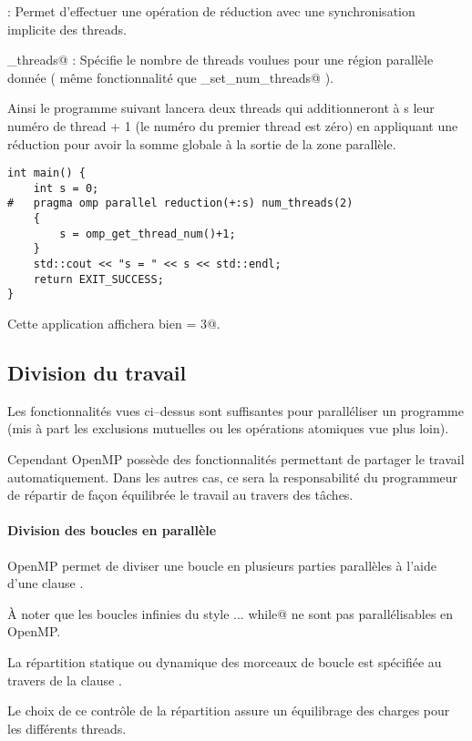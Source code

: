 \documentclass[fleqn,11pt]{article}
\begin{document}
\lstinline@reduction@ : Permet d'effectuer une opération de réduction avec une synchronisation implicite des threads.

\lstinline@num_threads@ : Spécifie le nombre de threads voulues pour une région parallèle donnée ( même fonctionnalité que \lstinline@omp_set_num_threads@ ).

Ainsi le programme suivant lancera deux threads qui additionneront à s leur numéro de thread + 1
(le numéro du premier thread est zéro) en appliquant une réduction pour avoir la somme globale à la
sortie de la zone parallèle.

\begin{lstlisting}
int main() {
    int s = 0;
#   pragma omp parallel reduction(+:s) num_threads(2)
    {
        s = omp_get_thread_num()+1;
    }
    std::cout << "s = " << s << std::endl;
    return EXIT_SUCCESS;
}
\end{lstlisting}

Cette application affichera bien \verb@s = 3@.

\subsection{Division du travail}

Les fonctionnalités vues ci--dessus sont suffisantes pour paralléliser un programme (mis à part
les exclusions mutuelles ou les opérations atomiques vue plus loin).

Cependant OpenMP possède des fonctionnalités permettant de partager le travail automatiquement.
Dans les autres cas, ce sera la responsabilité du programmeur de répartir de façon équilibrée le travail
au travers des tâches.

\paragraph{Division des boucles en parallèle}

OpenMP permet de diviser une boucle en plusieurs parties parallèles à l'aide d'une clause \verb@for@.

À noter que les boucles infinies du style \lstinline@do ... while@ ne sont pas parallélisables
en OpenMP.

La répartition statique ou dynamique des morceaux de boucle est spécifiée au travers de la clause
\verb@schedule@.

Le choix de ce contrôle de la répartition assure un équilibrage des charges pour les différents threads.
\end{document}
